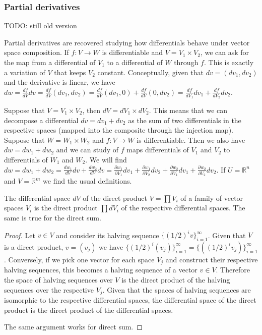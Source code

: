 \documentclass[11pt,letterpaper,fleqn]{memoir}
\begin{document}
\subsubsection{Partial derivatives}

TODO: still old version

Partial derivatives are recovered studying how differentials behave under vector space composition. If $f : V \to W$ is differentiable and $V = V_1 \times V_2$, we can ask for the map from a differential of $V_1$ to a differential of $W$ through $f$. This is exactly a variation of $V$ that keeps $V_2$ constant. Conceptually, given that $dv = (dv_1, dv_2)$ and the derivative is linear, we have $dw = \frac{df}{dV} dv = \frac{df}{dV} (dv_1, dv_2) = \frac{df}{dV} (dv_1, 0) + \frac{df}{dV} (0, dv_2) = \frac{df}{dV_1} dv_1 + \frac{df}{dV_2} dv_2$.
	
Suppose that $V = V_1 \times V_2$, then $dV = dV_1 \times dV_2$. This means that we can decompose a differential $dv= dv_1 + dv_2$ as the sum of two differentials in the respective spaces (mapped into the composite through the injection map). Suppose that $W = W_1 \times W_2$ and $f : V \to W$ is differentiable. Then we also have $dw= dw_1 + dw_2$ and we can study of $f$ maps differentials of $V_1$ and $V_2$ to differentials of $W_1$ and $W_2$. We will find $dw = dw_1 + dw_2 = \frac{dw_1}{dV} dv + \frac{dw_2}{dV} dv = \frac{\partial w_1}{\partial V_1} dv_1 + \frac{\partial w_1}{\partial V_2} dv_2 + \frac{\partial w_2}{\partial V_1} dv_1 + \frac{\partial w_2}{\partial V_2} dv_2$. If $U = \mathbb{R}^n$ and $V = \mathbb{R}^m$ we find the usual definitions.

\begin{prop}
	The differential space $dV$ of the direct product $V=\prod V_i$ of a family of vector spaces $V_i$ is the direct product $\prod dV_i$ of the respective differential spaces. The same is true for the direct sum.
\end{prop}

\begin{proof}
	Let $v \in V$ and consider its halving sequence $\{(1/2)^i v\}_{i=1}^{\infty}$. Given that $V$ is a direct product, $v=(v_j)$ we have $\{(1/2)^i (v_j)\}_{i=1}^{\infty} = \{((1/2)^i v_j)\}_{i=1}^{\infty}$. Conversely, if we pick one vector for each space $V_j$ and construct their respective halving sequences, this becomes a halving sequence of a vector $v \in V$. Therefore the space of halving sequences over $V$ is the direct product of the halving sequences over the respective $V_j$. Given that the spaces of halving sequences are isomorphic to the respective differential spaces, the differential space of the direct product is the direct product of the differential spaces.
	
	The same argument works for direct sum.
\end{proof}
\end{document}

